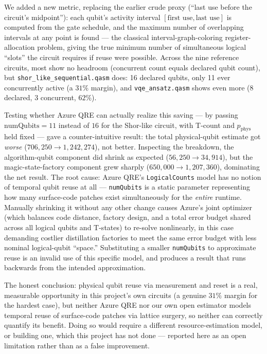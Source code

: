 \documentclass[9pt,twocolumn]{extarticle}
\begin{document}
We added a new metric, replacing the earlier crude proxy (``last use
before the circuit's midpoint''): each qubit's activity interval
$[\text{first use}, \text{last use}]$ is computed from the gate schedule,
and the maximum number of overlapping intervals at any point is found ---
the classical interval-graph-coloring register-allocation problem, giving
the true minimum number of simultaneous logical ``slots'' the circuit
requires if reuse were possible. Across the nine reference circuits, most
show no headroom (concurrent count equals declared qubit count), but
\texttt{shor\_like\_sequential.qasm} does: 16 declared qubits, only 11
ever concurrently active (a $31\%$ margin), and \texttt{vqe\_ansatz.qasm}
shows even more (8 declared, 3 concurrent, $62\%$).

Testing whether Azure QRE can actually realize this saving --- by passing
$\text{numQubits}=11$ instead of $16$ for the Shor-like circuit, with
T-count and $p_{\mathrm{phys}}$ held fixed --- gave a counter-intuitive
result: the total physical-qubit estimate got \emph{worse}
($706{,}250 \to 1{,}242{,}274$), not better. Inspecting the breakdown, the
algorithm-qubit component did shrink as expected ($56{,}250 \to 34{,}914$),
but the magic-state-factory component grew sharply
($650{,}000 \to 1{,}207{,}360$), dominating the net result. The root
cause: Azure QRE's \texttt{LogicalCounts} model has no notion of temporal
qubit reuse at all --- \texttt{numQubits} is a static parameter
representing how many surface-code patches exist simultaneously for the
\emph{entire} runtime. Manually shrinking it without any other change
causes Azure's joint optimizer (which balances code distance, factory
design, and a total error budget shared across all logical qubits and
T-states) to re-solve nonlinearly, in this case demanding costlier
distillation factories to meet the same error budget with less nominal
logical-qubit ``space.'' Substituting a smaller \texttt{numQubits} to
approximate reuse is an invalid use of this specific model, and produces a
result that runs backwards from the intended approximation.

The honest conclusion: physical qubit reuse via measurement and reset is a
real, measurable opportunity in this project's own circuits (a genuine
$31\%$ margin for the hardest case), but neither Azure QRE nor our own
open estimator models temporal reuse of surface-code patches via lattice
surgery, so neither can correctly quantify its benefit. Doing so would
require a different resource-estimation model, or building one, which
this project has not done --- reported here as an open limitation rather
than as a false improvement.
\end{document}
